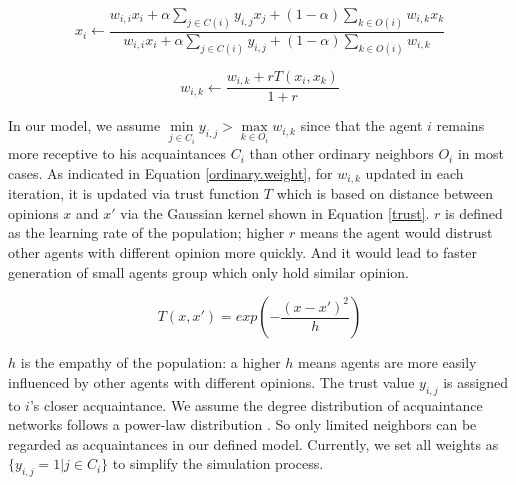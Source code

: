 \documentclass[11pt]{article}
\theoremstyle{definition}
\theoremstyle{basic}
\begin{document}
\begin{equation}
x_i \gets \frac{w_{i,i}x_i + \alpha\sum\limits_{j \in C(i)}y_{i,j}x_j + (1-\alpha)\sum\limits_{k \in O(i)}w_{i,k}x_k}{w_{i,i}x_i + \alpha\sum\limits_{j \in C(i)}y_{i,j} + (1-\alpha)\sum\limits_{k \in O(i)}w_{i,k}}
\end{equation} 

\begin{equation}
w_{i,k} \gets \frac{w_{i,k} + rT(x_i,x_k)}{1+r}
\label{ordinary.weight}
\end{equation}

In our model, we assume $\min\limits_{{j}\in C_i}{y_{i,j}} > \max\limits_{{k}\in O_i}{w_{i,k}}$ since that the agent $i$ remains more receptive to his acquaintances $C_i$ than other ordinary neighbors $O_i$ in most cases. As indicated in Equation \ref{ordinary.weight}, for $w_{i,k}$ updated in each iteration, it is updated via trust function $T$ which is based on distance between opinions $x$ and $x{'}$ via the Gaussian kernel shown in Equation \ref{trust}. $r$ is defined as the learning rate of the population; higher $r$ means the agent would distrust other agents with different opinion more quickly. And it would lead to faster generation of small agents group which only hold similar opinion.

\begin{equation}
T(x,x{'})=exp(-\frac{(x-x{'})^2}{h})
\label{trust}
\end{equation} 

$h$ is the empathy of the population: a higher $h$ means agents are more easily influenced by other agents with different opinions. The trust value $y_{i,j}$ is assigned to $i$'s closer acquaintance. We assume the degree distribution of acquaintance networks follows a power-law distribution \cite{muchnik2013origins}. So only limited neighbors can be regarded as acquaintances in our defined model. Currently, we set all weights as $\{y_{i,j}=1|j \in C_i\}$ to simplify the simulation process. 
\end{document}

